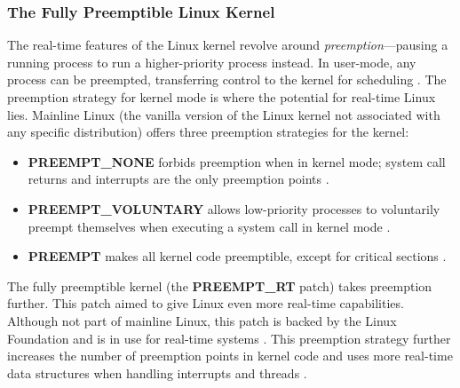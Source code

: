             \markboth{}{}
            \subsubsection{The Fully Preemptible Linux Kernel}
                The real-time features of the Linux kernel revolve around
                    \textit{preemption}---pausing a running process to run a
                    higher-priority process instead.
                In user-mode, any process can be preempted, transferring control
                    to the kernel for scheduling \cite{ubuntu-real-time-part2}.
                The preemption strategy for kernel mode is where the potential
                    for real-time Linux lies.
                Mainline Linux (the vanilla version of the Linux kernel not
                    associated with any specific distribution) offers three
                    preemption strategies for the kernel:
                \begin{itemize}
                    \item
                        \textbf{PREEMPT\_NONE} forbids preemption when in
                            kernel mode; system call returns and interrupts are
                            the only preemption points
                            \cite{linux-preemption-models}.
                    \item
                        \textbf{PREEMPT\_VOLUNTARY} allows low-priority
                            processes to voluntarily preempt themselves when
                            executing a system call in kernel mode
                            \cite{ubuntu-real-time-part3}.
                    \item
                        \textbf{PREEMPT} makes all kernel code preemptible,
                        except for critical sections
                        \cite{linux-preemption-models}.
                \end{itemize}

                The fully preemptible kernel (the \textbf{PREEMPT\_RT} patch)
                    takes preemption further.
                This patch aimed to give Linux even more real-time capabilities.
                Although not part of mainline Linux, this patch is backed by the
                    Linux Foundation and is in use for real-time systems
                    \cite{rt-linux-riscv}.
                This preemption strategy further increases the number of
                    preemption points in kernel code and uses more real-time
                    data structures when handling interrupts and threads
                    \cite{linux-preemption-models}.

